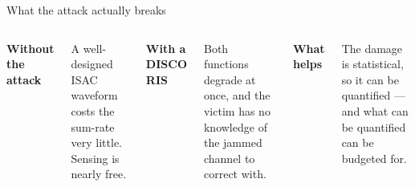 \begin{frame}{What the attack actually breaks}
  \vspace{0.5em}
  \begin{columns}[T,onlytextwidth]
      {\small\textbf{\textcolor{softgray}{Without the attack}}\par}
      \vspace{0.4em}
      {\small A well-designed ISAC waveform costs the sum-rate very little. Sensing is
       nearly free.\par}
      {\small\textbf{\textcolor{ranpurple}{With a DISCO RIS}}\par}
      \vspace{0.4em}
      {\small Both functions degrade at once, and the victim has no knowledge of the
       jammed channel to correct with.\par}
      {\small\textbf{\textcolor{softgreen}{What helps}}\par}
      \vspace{0.4em}
      {\small The damage is statistical, so it can be quantified --- and what can be
       quantified can be budgeted for.\par}
  \end{columns}

  \vspace{0.8em}

  \vspace{0.2em}
\end{frame}

